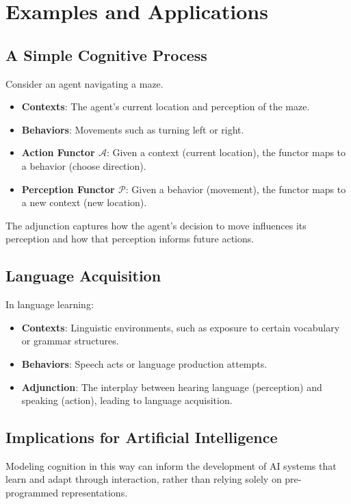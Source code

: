 \documentclass{article}
\begin{document}
\section{Examples and Applications}

\subsection{A Simple Cognitive Process}

Consider an agent navigating a maze.

\begin{itemize} \item \textbf{Contexts}: The agent's current location and perception of the maze. \item \textbf{Behaviors}: Movements such as turning left or right. \item \textbf{Action Functor $\mathcal{A}$}: Given a context (current location), the functor maps to a behavior (choose direction). \item \textbf{Perception Functor $\mathcal{P}$}: Given a behavior (movement), the functor maps to a new context (new location). \end{itemize}

The adjunction captures how the agent's decision to move influences its perception and how that perception informs future actions.

\subsection{Language Acquisition}

In language learning:

\begin{itemize} \item \textbf{Contexts}: Linguistic environments, such as exposure to certain vocabulary or grammar structures. \item \textbf{Behaviors}: Speech acts or language production attempts. \item \textbf{Adjunction}: The interplay between hearing language (perception) and speaking (action), leading to language acquisition. \end{itemize}

\subsection{Implications for Artificial Intelligence}

Modeling cognition in this way can inform the development of AI systems that learn and adapt through interaction, rather than relying solely on pre-programmed representations.
\end{document}
